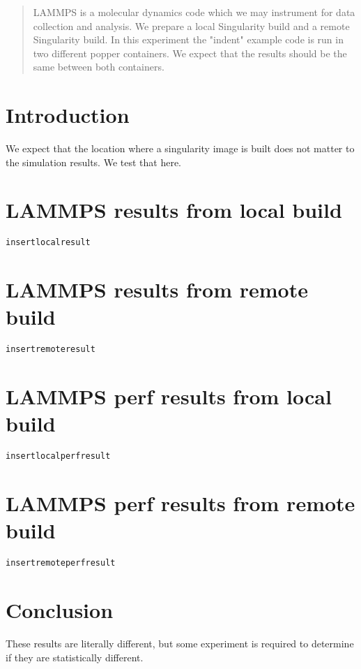 \documentclass[12pt]{article}
\begin{document}
\maketitle

\begin{abstract}
	LAMMPS is a molecular dynamics code which we may instrument for data collection and analysis. We prepare a local Singularity build and a remote Singularity build. In this experiment the "indent" example code is run in two different popper containers. We expect that the results should be the same between both containers.
\end{abstract}
\section*{Introduction}
We expect that the location where a singularity image is built does not matter to the simulation results. We test that here.
\section*{LAMMPS results from local build}
\begin{verbatim}
insertlocalresult
\end{verbatim}
\section*{LAMMPS results from remote build}
\begin{verbatim}
insertremoteresult
\end{verbatim}
\section*{LAMMPS perf results from local build}
\begin{verbatim}
insertlocalperfresult
\end{verbatim}
\section*{LAMMPS perf results from remote build}
\begin{verbatim}
insertremoteperfresult
\end{verbatim}
\section*{Conclusion}
These results are literally different, but some experiment is required to determine if they are statistically different.
\end{document}
